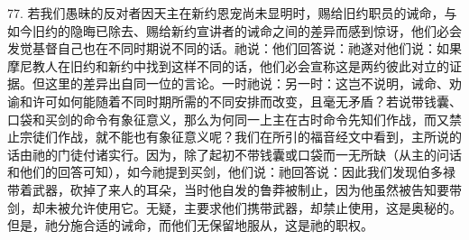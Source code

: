 77. 若我们愚昧的反对者因天主在新约恩宠尚未显明时，赐给旧约职员的诫命，与如今旧约的隐晦已除去、赐给新约宣讲者的诫命之间的差异而感到惊讶，他们必会发觉基督自己也在不同时期说不同的话。祂说：他们回答说：祂遂对他们说：如果摩尼教人在旧约和新约中找到这样不同的话，他们必会宣称这是两约彼此对立的证据。但这里的差异出自同一位的言论。一时祂说：另一时：这岂不说明，诫命、劝谕和许可如何能随着不同时期所需的不同安排而改变，且毫无矛盾？若说带钱囊、口袋和买剑的命令有象征意义，那么为何同一上主在古时命令先知们作战，而又禁止宗徒们作战，就不能也有象征意义呢？我们在所引的福音经文中看到，主所说的话由祂的门徒付诸实行。因为，除了起初不带钱囊或口袋而一无所缺（从主的问话和他们的回答可知），如今祂提到买剑，他们说：祂回答说：因此我们发现伯多禄带着武器，砍掉了来人的耳朵，当时他自发的鲁莽被制止，因为他虽然被告知要带剑，却未被允许使用它。无疑，主要求他们携带武器，却禁止使用，这是奥秘的。但是，祂分施合适的诫命，而他们无保留地服从，这是祂的职权。\par

